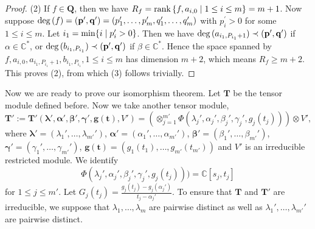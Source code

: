 \documentclass[12pt,leqno,amscd,amsfonts,amssymb]{amsart}
\def\a{\alpha}
\def\b{\beta}
\def\r{\gamma}
\def\C{\mathbb{C}}
\numberwithin{equation}{section}
\begin{document}
\begin{proof}
(2) If $f\in\bm{Q}$, then we have $R_{f}={\rm rank\,}\{f, a_{i, 0}\mid 1\leq i\leq m\}=m+1$. Now suppose ${\rm deg\,}(f)=(\mathbf{p}^\prime, \mathbf{q}^\prime)=(p_1^\prime,\ldots, p_m^\prime,  q_1^\prime,\ldots, q_m^\prime)$ with $p_i^\prime>0$ for some $1\leq i\leq m$. Let $i_1={\rm min}\{i\mid p_i^\prime>0\}$.  Then we have ${\rm deg\,}(a_{i_1, P_{i_1}+1})\prec (\mathbf{p}^\prime, \mathbf{q}^\prime)$ if $\a\in\C^*$, or ${\rm deg\,}(b_{i_1, P_{i_1}})\prec (\mathbf{p}^\prime, \mathbf{q}^\prime)$ if $\b\in\C^*$.
Hence the space spanned by $f, a_{i, 0}, a_{i_1, P_{i_1}+1}, b_{i_1, P_{i_1}}, 1\leq i\leq m$ has dimension $m+2$, which means $R_{f}\geq m+2$. This proves (2), from which (3) follows trivially.
\end{proof}
	
Now we are ready to prove our isomorphism theorem. Let $\bm{T}$ be the tensor module defined before. Now we take another tensor module,
\begin{equation*}
\bm{T'}:=\bm{T'}(\bm{\lambda}', \bm{\alpha}',  \bm{\b}', \bm{\r}', \bm{g(t)}, V')=(\otimes_{j=1}^{m'}\Phi(\lambda_j', \alpha_j', \b_j', \r_j', g_j(t_j)))\otimes V',
\end{equation*}
where $\bm{\lambda}'=(\lambda_1', \ldots, \lambda_{m'}')$, $\bm{\alpha}'=(\alpha_1', \ldots, \alpha_{m'}')$, $\bm{\b}'=(\b_1', \ldots, \b_{m'}')$, $\bm{\r}'=(\r_1', \ldots, \r_{m'}')$, $\bm{g(t)}=(g_1(t_1), \ldots, g_{m'}(t_{m'}))$ and $V'$ is an irreducible restricted module. We identify $$\Phi(\lambda_j', \alpha_j', \b_j', \r_j', g_j(t_j)))=\C[s_j, t_j]$$ for $1\leq j\leq m'$. Let $G_j(t_j)=\frac{g_j(t_j)-g_j(\a_j')}{t_j-\a_j'}$. To ensure that $\bm{T}$ and $\bm{T'}$ are irreducible, we suppose that $\lambda_1, \ldots, \lambda_{m}$  are pairwise distinct 
as well as  $\lambda_1', \ldots, \lambda_{m'}'$ are pairwise distinct.
	
\end{document}
